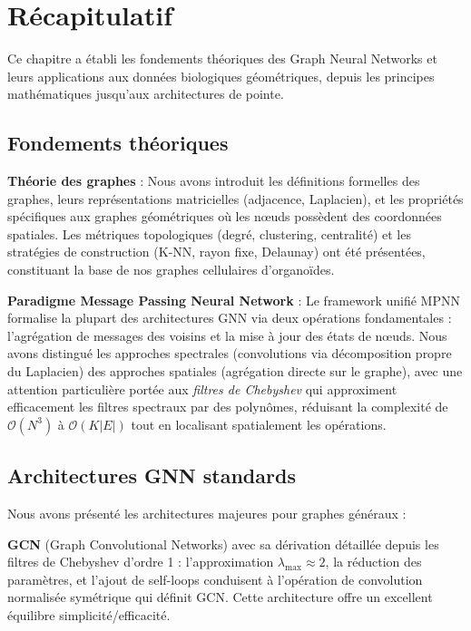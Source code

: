 \section{Récapitulatif}

Ce chapitre a établi les fondements théoriques des Graph Neural Networks et leurs applications aux données biologiques géométriques, depuis les principes mathématiques jusqu'aux architectures de pointe.

\subsection*{Fondements théoriques}

\textbf{Théorie des graphes} : Nous avons introduit les définitions formelles des graphes, leurs représentations matricielles (adjacence, Laplacien), et les propriétés spécifiques aux graphes géométriques où les nœuds possèdent des coordonnées spatiales. Les métriques topologiques (degré, clustering, centralité) et les stratégies de construction (K-NN, rayon fixe, Delaunay) ont été présentées, constituant la base de nos graphes cellulaires d'organoïdes.

\textbf{Paradigme Message Passing Neural Network} : Le framework unifié MPNN formalise la plupart des architectures GNN via deux opérations fondamentales : l'agrégation de messages des voisins et la mise à jour des états de nœuds. Nous avons distingué les approches spectrales (convolutions via décomposition propre du Laplacien) des approches spatiales (agrégation directe sur le graphe), avec une attention particulière portée aux \textit{filtres de Chebyshev} qui approximent efficacement les filtres spectraux par des polynômes, réduisant la complexité de $\mathcal{O}(N^3)$ à $\mathcal{O}(K|E|)$ tout en localisant spatialement les opérations.

\subsection*{Architectures GNN standards}

Nous avons présenté les architectures majeures pour graphes généraux :

\textbf{GCN} (Graph Convolutional Networks) avec sa dérivation détaillée depuis les filtres de Chebyshev d'ordre 1 : l'approximation $\lambda_{\max} \approx 2$, la réduction des paramètres, et l'ajout de self-loops conduisent à l'opération de convolution normalisée symétrique qui définit GCN. Cette architecture offre un excellent équilibre simplicité/efficacité.

